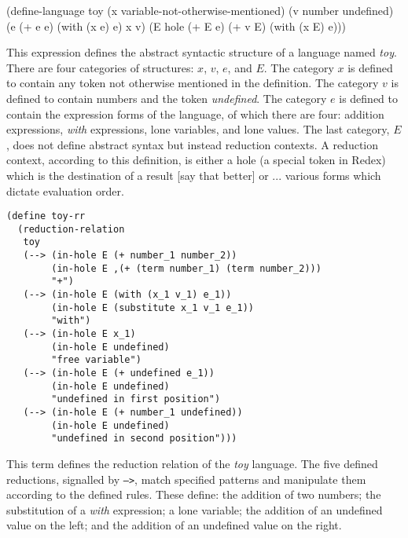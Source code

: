 \documentclass[ms,electronic,twosidetoc,letterpaper,chaptercenter,parttop]{byumsphd}
\begin{document}
\begin{schemedisplay}
(define-language toy
  (x variable-not-otherwise-mentioned)
  (v number undefined) 
  (e (+ e e) (with (x e) e) x v)
  (E hole (+ E e) (+ v E) (with (x E) e)))
\end{schemedisplay}

This expression defines the abstract syntactic structure of a language named \emph{toy}. There are 
four categories of structures: $x$, $v$, $e$, and $E$. The category $x$ is defined to contain any 
token not otherwise mentioned in the definition. The category $v$ is defined to contain numbers 
and the token \emph{undefined}. The category $e$ is defined to contain the expression forms of 
the language, of which there are four: addition expressions, \emph{with} expressions, lone 
variables, and lone values. The last category, $E$, does not define abstract syntax but instead 
reduction contexts. A reduction context, according to this definition, is either a hole (a special 
token in Redex) which is the destination of a result [say that better] or ... various forms which 
dictate evaluation order.

\begin{verbatim}
(define toy-rr
  (reduction-relation
   toy
   (--> (in-hole E (+ number_1 number_2))
        (in-hole E ,(+ (term number_1) (term number_2)))
        "+")
   (--> (in-hole E (with (x_1 v_1) e_1))
        (in-hole E (substitute x_1 v_1 e_1))
        "with")
   (--> (in-hole E x_1)
        (in-hole E undefined)
        "free variable")
   (--> (in-hole E (+ undefined e_1))
        (in-hole E undefined)
        "undefined in first position")
   (--> (in-hole E (+ number_1 undefined))
        (in-hole E undefined)
        "undefined in second position")))
\end{verbatim}

This term defines the reduction relation of the \emph{toy} language. The five defined reductions, 
signalled by \texttt{-->}, match specified patterns and manipulate them according to the defined 
rules. These define: the addition of two numbers; the substitution of a \emph{with} expression; 
a lone variable; the addition of an undefined value on the left; and the addition of an undefined 
value on the right.
\end{document}
